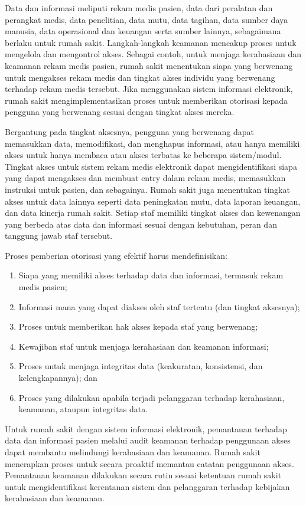 \documentclass[
]{book}
\providecommand{\tightlist}{%
  \setlength{\itemsep}{0pt}\setlength{\parskip}{0pt}}
\begin{document}
Data dan informasi meliputi rekam medis pasien, data dari peralatan dan perangkat medis, data penelitian, data mutu, data tagihan, data sumber daya manusia, data operasional dan keuangan serta sumber lainnya, sebagaimana berlaku untuk rumah sakit. Langkah-langkah keamanan mencakup proses untuk mengelola dan mengontrol akses. Sebagai contoh, untuk menjaga kerahasiaan dan keamanan rekam medis pasien, rumah sakit menentukan siapa yang berwenang untuk mengakses rekam medis dan tingkat akses individu yang berwenang terhadap rekam medis tersebut. Jika menggunakan sistem informasi elektronik, rumah sakit mengimplementasikan proses untuk memberikan otorisasi kepada pengguna yang berwenang sesuai dengan tingkat akses mereka.

Bergantung pada tingkat aksesnya, pengguna yang berwenang dapat memasukkan data, memodifikasi, dan menghapus informasi, atau hanya memiliki akses untuk hanya membaca atau akses terbatas ke beberapa sistem/modul. Tingkat akses untuk sistem rekam medis elektronik dapat mengidentifikasi siapa yang dapat mengakses dan membuat entry dalam rekam medis, memasukkan instruksi untuk pasien, dan sebagainya. Rumah sakit juga menentukan tingkat akses untuk data lainnya seperti data peningkatan mutu, data laporan keuangan, dan data kinerja rumah sakit. Setiap staf memiliki tingkat akses dan kewenangan yang berbeda atas data dan informasi sesuai dengan kebutuhan, peran dan tanggung jawab staf tersebut.

Proses pemberian otorisasi yang efektif harus mendefinisikan:

\begin{enumerate}
\def\labelenumi{\alph{enumi}.}
\tightlist
\item
  Siapa yang memiliki akses terhadap data dan informasi, termasuk rekam medis pasien;
\item
  Informasi mana yang dapat diakses oleh staf tertentu (dan tingkat aksesnya);
\item
  Proses untuk memberikan hak akses kepada staf yang berwenang;
\item
  Kewajiban staf untuk menjaga kerahasiaan dan keamanan informasi;
\item
  Proses untuk menjaga integritas data (keakuratan, konsistensi, dan kelengkapannya); dan
\item
  Proses yang dilakukan apabila terjadi pelanggaran terhadap kerahasiaan, keamanan, ataupun integritas data.
\end{enumerate}

Untuk rumah sakit dengan sistem informasi elektronik, pemantauan terhadap data dan informasi pasien melalui audit keamanan terhadap penggunaan akses dapat membantu melindungi kerahasiaan dan keamanan. Rumah sakit menerapkan proses untuk secara proaktif memantau catatan penggunaan akses. Pemantauan keamanan dilakukan secara rutin sesuai ketentuan rumah sakit untuk mengidentifikasi kerentanan sistem dan pelanggaran terhadap kebijakan kerahasiaan dan keamanan.
\end{document}
